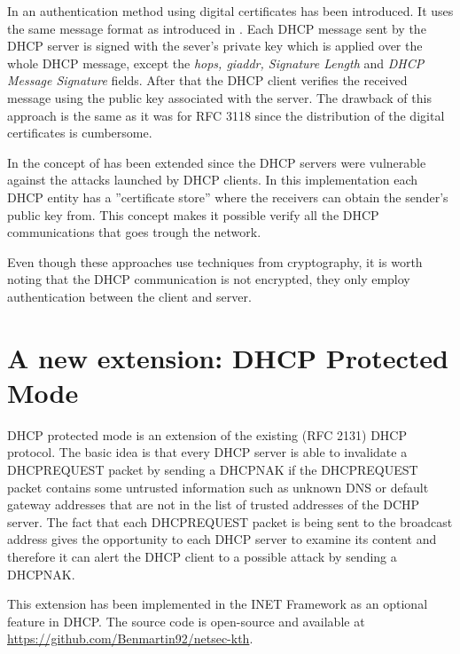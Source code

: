 \documentclass[letterpaper, 10 pt, conference]{ieeeconf}  %
\begin{document}
In \cite{6866756} an authentication method using digital certificates has been introduced. It uses the same message format as introduced in \cite{dhcpauthrfc}. Each DHCP message sent by the DHCP server is signed with the sever's private key which is applied over the whole DHCP message, except the \textit{hops, giaddr, Signature Length} and \textit{DHCP Message Signature} fields. After that the DHCP client verifies the received message using the public key associated with the server. The drawback of this approach is the same as it was for RFC 3118 since the distribution of the digital certificates is cumbersome.

In \cite{7208238} the concept of \cite{6866756} has been extended since the DHCP servers were vulnerable against the attacks launched by DHCP clients. In this implementation each DHCP entity has a ''certificate store'' where the receivers can obtain the sender's public key from. This concept makes it possible verify all the DHCP communications that goes trough the network.

Even though these approaches use techniques from cryptography, it is worth noting that the DHCP communication is not encrypted, they only employ authentication between the client and server. 
\section{A new extension: DHCP Protected Mode}\label{sec:protected-mode}
DHCP protected mode is an extension of the existing (RFC 2131) DHCP protocol. The basic idea is that every DHCP server is able to invalidate a DHCPREQUEST packet by sending a DHCPNAK if the DHCPREQUEST packet contains some untrusted information such as unknown DNS or default gateway addresses that are not in the list of trusted addresses of the DCHP server. The fact that each DHCPREQUEST packet is being sent to the broadcast address gives the opportunity to each DHCP server to examine its content and therefore it can alert the DHCP client to a possible attack by sending a DHCPNAK.

This extension has been implemented in the INET Framework as an optional feature in DHCP. The source code is open-source and available at \url{https://github.com/Benmartin92/netsec-kth}.
\end{document}
